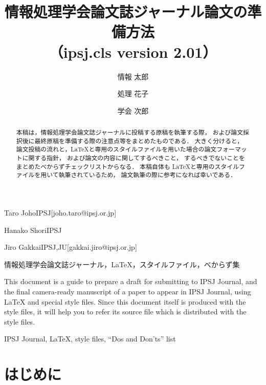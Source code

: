 \documentclass[submit]{ipsj}
\begin{document}
\title{情報処理学会論文誌ジャーナル論文の準備方法\\
（ipsj.cls version 2.01）}





\author{情報 太郎}{Taro Joho}{IPSJ}[joho.taro@ipsj.or.jp]
\author{処理 花子}{Hanako Shori}{IPSJ}
\author{学会 次郎}{Jiro Gakkai}{IPSJ,JU}[gakkai.jiro@ipsj.or.jp]

\begin{abstract}
本稿は，情報処理学会論文誌ジャーナルに投稿する原稿を執筆する際，
および論文採択後に最終原稿を準備する際の注意点等をまとめたものである．
大きく分けると，
論文投稿の流れと，\LaTeX と専用のスタイルファイルを用いた場合の論文フォーマットに関する指針，
および論文の内容に関してするべきこと，
するべきでないことをまとめたべからずチェックリストからなる．
本稿自体も \LaTeX と専用のスタイルファイルを用いて執筆されているため，
論文執筆の際に参考になれば幸いである．
\end{abstract}


\begin{jkeyword}
情報処理学会論文誌ジャーナル，\LaTeX，スタイルファイル，べからず集
\end{jkeyword}

\begin{eabstract}
This document is a guide to prepare a draft for submitting to IPSJ
Journal, and the final camera-ready manuscript of a paper to appear in
IPSJ Journal, using {\LaTeX} and special style files.  Since this
document itself is produced with the style files, it will help you to
refer its source file which is distributed with the style files.
\end{eabstract}

\begin{ekeyword}
IPSJ Journal, \LaTeX, style files, ``Dos and Don'ts'' list
\end{ekeyword}

\maketitle

\section{はじめに}
\end{document}
